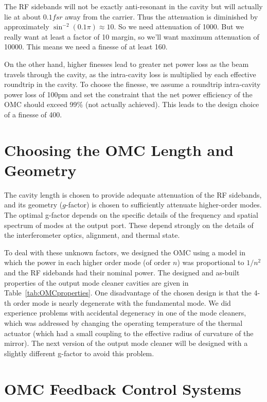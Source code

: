 The RF sidebands will not be exactly anti-resonant in the cavity but
will actually lie at about $0.1 fsr$ away from the carrier.  Thus the
attenuation is diminished by approximately $\sin^{-2} (0.1 \pi)
\approx 10$.  So we need attenuation of 1000.  But we really want at
least a factor of 10 margin, so we'll want maximum attenuation of
10000. This means we need a finesse of at least 160.

On the other hand, higher finesses lead to greater net power loss as
the beam travels through the cavity, as the intra-cavity loss is
multiplied by each effective roundtrip in the cavity.  To choose the
finesse, we assume a roundtrip intra-cavity power loss of 100pm and
set the constraint that the net power efficiency of the OMC should
exceed 99\% (not actually achieved).  This leads to the design choice
of a finesse of 400.

\section{Choosing the OMC Length and Geometry}

The cavity length is chosen to provide adequate attenuation of the RF
sidebands, and its geometry ($g$-factor) is chosen to sufficiently
attenuate higher-order modes.  The optimal g-factor depends on the
specific details of the frequency and spatial spectrum of modes at the
output port.  These depend strongly on the details of the
interferometer optics, alignment, and thermal state. 

To deal with these unknown factors, we designed the OMC using a model
in which the power in each higher order mode (of order $n$) was proportional to
$1/n^2$ and the RF sidebands had their nominal power.  The designed
and as-built properties of the output mode cleaner cavities are given
in Table~\ref{tab:OMCproperties}.
%
One disadvantage of the chosen design is that the 4-th order mode is
nearly degenerate with the fundamental mode.  We did experience
problems with accidental degeneracy in one of the mode cleaners, which
was addressed by changing the operating temperature of the thermal
actuator (which had a small coupling to the effective radius of
curvature of the mirror).  The next version of the output mode cleaner
will be designed with a slightly different g-factor to avoid this
problem.


\section{OMC Feedback Control Systems}

